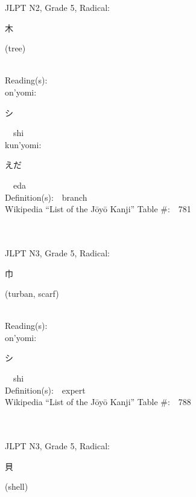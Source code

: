 \begin{multicols}{2}
{JLPT N2, Grade 5, Radical:\ \ {\begin{CJK}{UTF8}{min} 木 \end{CJK}} (tree) } \\
Reading(s):\ \ \\
{\hspace*{1em}}on'yomi:\ \ \\
{\hspace*{2em}}{\begin{CJK}{UTF8}{min} シ \end{CJK}}\ \ shi\ \ \\
{\hspace*{1em}}kun'yomi:\ \ \\
{\hspace*{2em}}{\begin{CJK}{UTF8}{min} えだ \end{CJK}}\ \ eda\ \ \\
Definition(s):\ \ branch \\
Wikipedia ``List of the J\=oy\=o Kanji'' Table \#:\ \ 781 \\
\ \ \\
{\fontsize{34pt}{40pt}  }\ \ \\  %
{JLPT N3, Grade 5, Radical:\ \ {\begin{CJK}{UTF8}{min} 巾 \end{CJK}} (turban, scarf) } \\
Reading(s):\ \ \\
{\hspace*{1em}}on'yomi:\ \ \\
{\hspace*{2em}}{\begin{CJK}{UTF8}{min} シ \end{CJK}}\ \ shi\ \ \\
Definition(s):\ \ expert \\
Wikipedia ``List of the J\=oy\=o Kanji'' Table \#:\ \ 788 \\
\ \ \\
{\fontsize{34pt}{40pt}  }\ \ \\  %
{JLPT N3, Grade 5, Radical:\ \ {\begin{CJK}{UTF8}{min} 貝 \end{CJK}} (shell) } \\

\end{multicols}
